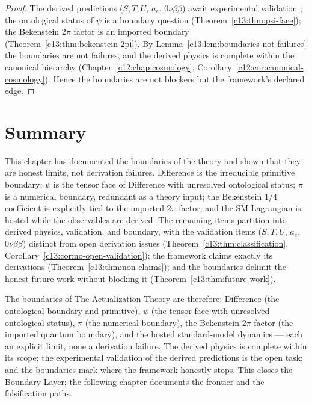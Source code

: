 \begin{proof}
The derived predictions ($S,T,U$, $a_e$, $0\nu\beta\beta$) await experimental validation
\cite{c13:VALID001}; the ontological status of $\psi$ is a boundary question
(Theorem~\ref{c13:thm:psi-face}); the Bekenstein $2\pi$ factor is an imported boundary
(Theorem~\ref{c13:thm:bekenstein-2pi}). By Lemma~\ref{c13:lem:boundaries-not-failures} the
boundaries are not failures, and the derived physics is complete within the canonical
hierarchy (Chapter~\ref{c12:chap:cosmology}, Corollary~\ref{c12:cor:canonical-cosmology}).
Hence the boundaries are not blockers but the framework's declared edge.
\end{proof}

\section{Summary}
\label{c13:sec:boundaries-summary}

This chapter has documented the boundaries of the theory and shown that they are honest
limits, not derivation failures. Difference is the irreducible primitive boundary; $\psi$ is
the tensor face of Difference with unresolved ontological status; $\pi$ is a numerical
boundary, redundant as a theory input; the Bekenstein $1/4$ coefficient is explicitly tied
to the imported $2\pi$ factor; and the SM Lagrangian is hosted while the observables are
derived. The remaining items partition into derived physics, validation, and boundary, with
the validation items ($S,T,U$, $a_e$, $0\nu\beta\beta$) distinct from open derivation issues
(Theorem~\ref{c13:thm:classification}, Corollary~\ref{c13:cor:no-open-validation}); the
framework claims exactly its derivations (Theorem~\ref{c13:thm:non-claims}); and the
boundaries delimit the honest future work without blocking it
(Theorem~\ref{c13:thm:future-work}).

The boundaries of The Actualization Theory are therefore: Difference (the ontological
boundary and primitive), $\psi$ (the tensor face with unresolved ontological status),
$\pi$ (the numerical boundary), the Bekenstein $2\pi$ factor (the imported quantum
boundary), and the hosted standard-model dynamics --- each an explicit limit, none a
derivation failure. The derived physics is complete within its scope; the experimental
validation of the derived predictions is the open task; and the boundaries mark where the
framework honestly stops. This closes the Boundary Layer; the following chapter documents
the frontier and the falsification paths.

